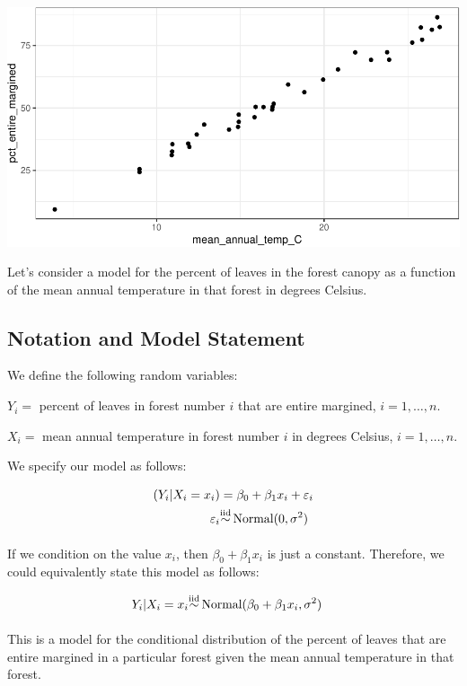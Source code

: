 \documentclass[]{article}
\begin{document}
\includegraphics{20190213_mle_slr_files/figure-latex/unnamed-chunk-1-1.pdf}

Let's consider a model for the percent of leaves in the forest canopy as
a function of the mean annual temperature in that forest in degrees
Celsius.

\subsection{Notation and Model
Statement}\label{notation-and-model-statement}

We define the following random variables:

\(Y_i =\) percent of leaves in forest number \(i\) that are entire
margined, \(i = 1, \ldots, n\).

\(X_i =\) mean annual temperature in forest number \(i\) in degrees
Celsius, \(i = 1, \ldots, n\).

We specify our model as follows:

\begin{align*}
(Y_i | X_i = x_i) &= \beta_0 + \beta_1 x_i + \varepsilon_i \\
\varepsilon_i &{\mathrel {\mathop {\sim}\limits _{}^{\rm iid}}\,} \text{Normal}(0, \sigma^2)
\end{align*}

If we condition on the value \(x_i\), then \(\beta_0 + \beta_1 x_i\) is
just a constant. Therefore, we could equivalently state this model as
follows:

\begin{align*}
Y_i | X_i = x_i &{\mathrel {\mathop {\sim}\limits _{}^{\rm iid}}\,} \text{Normal}(\beta_0 + \beta_1 x_i, \sigma^2)
\end{align*}

This is a model for the conditional distribution of the percent of
leaves that are entire margined in a particular forest given the mean
annual temperature in that forest.
\end{document}
